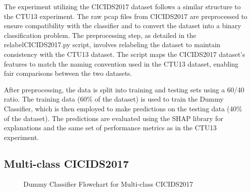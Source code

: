 The experiment utilizing the CICIDS2017 dataset follows a similar structure to the CTU13 experiment. The raw pcap files from CICIDS2017 are preprocessed to ensure compatibility with the classifier and to convert the dataset into a binary classification problem. The preprocessing step, as detailed in the relabelCICIDS2017.py script, involves relabeling the dataset to maintain consistency with the CTU13 dataset. The script maps the CICIDS2017 dataset's features to match the naming convention used in the CTU13 dataset, enabling fair comparisons between the two datasets.

After preprocessing, the data is split into training and testing sets using a 60/40 ratio. The training data (60\% of the dataset) is used to train the Dummy Classifier, which is then employed to make predictions on the testing data (40\% of the dataset). The predictions are evaluated using the SHAP library for explanations and the same set of performance metrics as in the CTU13 experiment.

\subsection{Multi-class CICIDS2017}

\begin{figure}[H]
\centering
{}
\caption{Dummy Classifier Flowchart for Multi-class CICIDS2017}\label{fig:DummyRandomFlowMultiCICIDS2017}
\end{figure}


